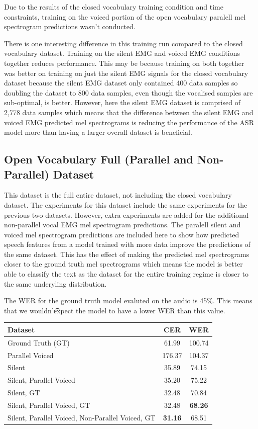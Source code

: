 Due to the results of the closed vocabulary training condition and time constraints,
training on the voiced portion of the open vocabulary paralell mel spectrogram
predictions wasn't conducted.

There is one interesting difference in this training run compared to the closed
vocabulary dataset. Training on the silent EMG and voiced EMG conditions together
reduces performance. This may be because training on both together was better
on training on just the silent EMG signals for the closed vocabulary dataset
because the silent EMG dataset only contained 400 data samples so doubling
the dataset to 800 data samples, even though the vocalised samples are sub-optimal,
is better. However, here the silent EMG dataset is comprised of 2,778 data samples
which means that the difference between the silent EMG and voiced EMG predicted
mel spectrograms is reducing the performance of the ASR model more than having a
larger overall dataset is beneficial.

\subsection{Open Vocabulary Full (Parallel and Non-Parallel) Dataset}

This dataset is the full entire dataset, not including the closed vocabulary
dataset. The experiments for this dataset include the same experiments for
the previous two datasets. However, extra experiments are added for the additional
non-parallel vocal EMG mel spectrogram predictions. The paralell silent and voiced
mel spectrogram predictions are included here to show how predicted speech features
from a model trained with more data improve the predictions of the same dataset.
This has the effect of making the predicted mel spectrograms closer to the ground
truth mel spectrograms which means the model is better able to classify the text
as the dataset for the entire training regime is closer to the same underyling distribution.

The WER for the ground truth model evaluted on the audio is 45\%. This means that we wouldn'\t
expect the model to have a lower WER than this value.

{\small\begin{center}
\begin{tabular} {  l  c  c  }
\hline
\textbf{Dataset} & \textbf{CER} & \textbf{WER} \\
\hline
Ground Truth (GT) & 61.99 & 100.74 \\
Parallel Voiced & 176.37 & 104.37 \\
Silent & 35.89 & 74.15 \\
Silent, Parallel Voiced & 35.20 & 75.22 \\
Silent, GT & 32.48 & 70.84 \\
\hline
Silent, Parallel Voiced, GT & 32.48 & \textbf{68.26} \\
Silent, Parallel Voiced, Non-Parallel Voiced, GT & \textbf{31.16} & 68.51 \\
\hline
\end{tabular}
\end{center}}

